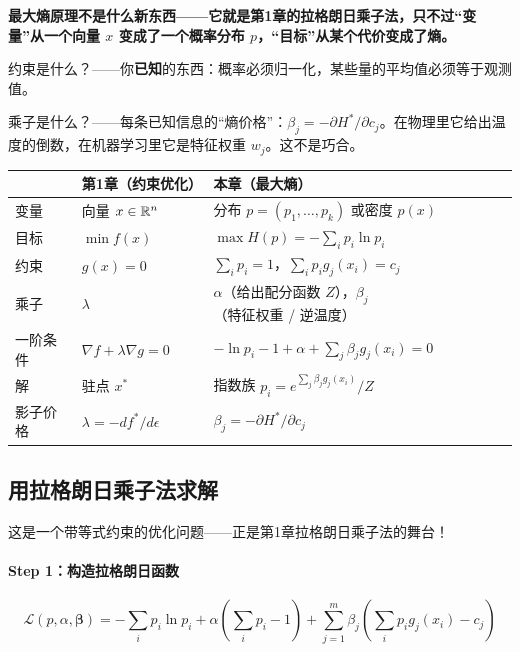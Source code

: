 \begin{tcolorbox}[colback=yellow!10, colframe=orange!80, title=本章的核心观点]
\textbf{最大熵原理不是什么新东西——它就是第1章的拉格朗日乘子法，只不过“变量”从一个向量 $x$ 变成了一个概率分布 $p$，“目标”从某个代价变成了熵。}

约束是什么？——你\textbf{已知}的东西：概率必须归一化，某些量的平均值必须等于观测值。

乘子是什么？——每条已知信息的“熵价格”：$\beta_j = -\partial H^*/\partial c_j$。在物理里它给出温度的倒数，在机器学习里它是特征权重 $w_j$。这不是巧合。

\begin{center}
\renewcommand{\arraystretch}{1.3}
\small
\begin{tabularx}{\linewidth}{llX}
\toprule
 & \textbf{第1章（约束优化）} & \textbf{本章（最大熵）} \\
\midrule
变量 & 向量 $x \in \mathbb{R}^n$ & 分布 $p = (p_1, \ldots, p_k)$ 或密度 $p(x)$ \\
目标 & $\min f(x)$ & $\max H(p) = -\sum_i p_i \ln p_i$ \\
约束 & $g(x) = 0$ & $\sum_i p_i = 1$，$\sum_i p_i g_j(x_i) = c_j$ \\
乘子 & $\lambda$ & $\alpha$（给出配分函数 $Z$），$\beta_j$（特征权重 / 逆温度） \\
一阶条件 & $\nabla f + \lambda \nabla g = 0$ & $-\ln p_i - 1 + \alpha + \sum_j \beta_j g_j(x_i) = 0$ \\
解 & 驻点 $x^*$ & 指数族 $p_i = e^{\sum_j \beta_j g_j(x_i)} / Z$ \\
影子价格 & $\lambda = -df^*/d\epsilon$ & $\beta_j = -\partial H^*/\partial c_j$ \\
\bottomrule
\end{tabularx}
\end{center}
\end{tcolorbox}

\subsection{用拉格朗日乘子法求解}

这是一个带等式约束的优化问题——正是第1章拉格朗日乘子法的舞台！

\paragraph{Step 1：构造拉格朗日函数}
\begin{equation}
\mathcal{L}(p, \alpha, \bm{\beta}) = -\sum_i p_i \ln p_i + \alpha\left(\sum_i p_i - 1\right) + \sum_{j=1}^{m} \beta_j \left(\sum_i p_i g_j(x_i) - c_j\right)
\end{equation}

